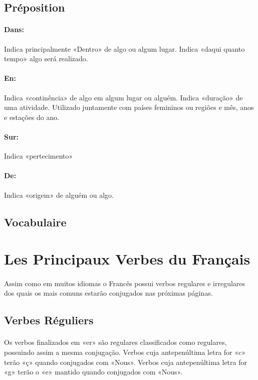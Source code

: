 \documentclass{article}
\begin{document}
    \subsection{Préposition}
        \paragraph{Dans:}Indica principalmente «Dentro» de algo ou algum lugar. Indica «daqui quanto tempo» algo será realizado.
        
        \paragraph{En:}Indica «continência» de algo em algum lugar ou alguém. Indica «duração» de uma atividade. Utilizado juntamente com países femininos ou regiões e mês, anos e estações do ano.
        
        \paragraph{Sur:}Indica «pertecimento»
        
        \paragraph{De:}Indica «origem» de alguém ou algo.

    \subsection{Vocabulaire}
    
\newpage

\section{Les Principaux Verbes du Français}
    \paragraph{}Assim como em muitos idiomas o Francês possui verbos regulares e irregulares dos quais os mais comuns estarão conjugados nas próximas páginas.
            
    \subsection{Verbes Réguliers}
        \paragraph{}Os verbos finalizados em «er» são regulares classificados como regulares, possuindo assim a mesma conjugação. Verbos cuja antepenúltima letra for «c» terão «ç» quando conjugados com «Nous». Verbos cuja antepenúltima letra for «g» terão o «e» mantido quando conjugados com «Nous».    
\end{document}

